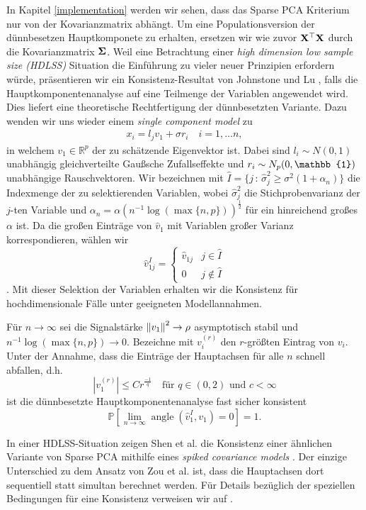 In Kapitel \ref{implementation} werden wir sehen, dass das Sparse PCA Kriterium nur von der Kovarianzmatrix abhängt. Um eine Populationsversion der dünnbesetzen Hauptkomponete zu erhalten, ersetzen wir wie zuvor $\mathbf{X}^{\top} \mathbf{X}$ durch die Kovarianzmatrix $\mathbf{\Sigma}$. Weil eine Betrachtung einer \textit{high dimension low sample size (HDLSS)} Situation die Einführung zu vieler neuer Prinzipien erfordern würde, präsentieren wir ein Konsistenz-Resultat von Johnstone und Lu \cite{johnstone}, falls die Hauptkomponentenanalyse auf eine Teilmenge der Variablen angewendet wird. Dies liefert eine theoretische Rechtfertigung der dünnbesetzten Variante. Dazu wenden wir uns wieder einem \textit{single component model} zu
\begin{align}
\label{single_component_model_spca}
x_i = l_j v_1 + \sigma r_i \quad i = 1, \ldots n,
\end{align}
in welchem $v_1 \in \mathbb{R}^p$ der zu schätzende Eigenvektor ist. Dabei sind $l_i \sim N(0,1)$ unabhängig gleichverteilte Gaußsche Zufallseffekte und $r_i \sim N_p(0, \mat{\mathbb{1}})$ unabhängige Rauschvektoren. Wir bezeichnen mit $\widehat{I} = \{j \, \colon \, \widehat{\sigma}_j^2 \geq \sigma^2 (1 + \alpha_n)\}$ die Indexmenge der zu selektierenden Variablen, wobei $\widehat{\sigma}_j^2$ die Stichprobenvarianz der $j$-ten Variable und $\alpha_n = \alpha (n^{-1}\log(\max \{n,p\}))^{\frac{1}{2}}$ für ein hinreichend großes $\alpha$ ist. Da die großen Einträge von $\widehat{v}_1$ mit Variablen großer Varianz korrespondieren, wählen wir 
$$\widehat{v}_{1j}^I = \begin{cases} 
      \widehat{v}_{1j} & j \in \widehat{I}\\
      0 & j \not\in \widehat{I}
   \end{cases}$$.
Mit dieser Selektion der Variablen erhalten wir die Konsistenz für hochdimensionale Fälle unter geeigneten Modellannahmen.

\begin{thm}
Für $n \to \infty$ sei die Signalstärke $\left\lVert v_1 \right\rVert^2 \to \rho$ asymptotisch stabil und $n^{-1}\log(\max \{n,p\}) \to 0$. Bezeichne mit $v_i^{(r)}$ den $r$-größten Eintrag von $v_i$. Unter der Annahme, dass die Einträge der Hauptachsen für alle $n$ schnell abfallen, d.h.
$$|v_1^{(r)}| \leq Cr^{\frac{-1}{q}} \quad \text{für } q \in (0,2) \text{ und } c < \infty$$
ist die dünnbesetzte Hauptkomponentenanalyse fast sicher konsistent
$$\mathbb{P}\left[\lim_{n \to \infty} \operatorname{angle}(\widehat{v}_1^I, v_1) = 0\right] = 1.$$ 
\end{thm}

In einer HDLSS-Situation zeigen Shen et al. die Konsistenz einer ähnlichen Variante von Sparse PCA mithilfe eines \textit{spiked covariance models} \cite{shen}. Der einzige Unterschied zu dem Ansatz von Zou et al. ist, dass die Hauptachsen dort sequentiell statt simultan berechnet werden. Für Details bezüglich der speziellen Bedingungen für eine Konsistenz verweisen wir auf \cite{shen_consistency}.
